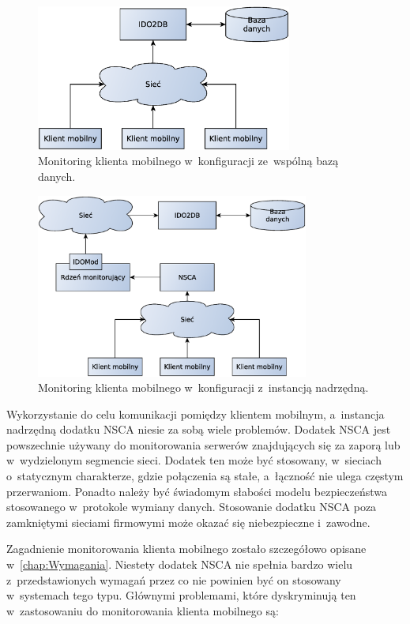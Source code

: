 \begin{figure}[h]
  \centering
  \caption{Monitoring klienta mobilnego w~konfiguracji ze~wspólną bazą
    danych.}
  \label{fig:mobilnyWspBaza}
\includegraphics[width=0.75\textwidth]{img/mobilnyWspBaza}
\end{figure}

\begin{figure}[h]
  \centering
  \caption{Monitoring klienta mobilnego w~konfiguracji z~instancją
    nadrzędną.}
  \label{fig:mobilnyInstancja}
\includegraphics[width=0.80\textwidth]{img/mobilnyInstancja}
\end{figure}

Wykorzystanie do celu komunikacji pomiędzy klientem mobilnym,
a~instancja nadrzędną dodatku NSCA niesie za sobą wiele problemów.
Dodatek NSCA jest powszechnie używany do monitorowania serwerów
znajdujących się za zaporą lub w~wydzielonym segmencie sieci. Dodatek
ten może być stosowany, w~sieciach o~statycznym charakterze, gdzie
połączenia są stałe, a~łączność nie ulega częstym przerwaniom. Ponadto
należy być świadomym słabości modelu bezpieczeństwa stosowanego
w~protokole wymiany danych. Stosowanie dodatku NSCA poza zamkniętymi
sieciami firmowymi może okazać się niebezpieczne i~zawodne.

Zagadnienie monitorowania klienta mobilnego zostało szczegółowo
opisane w~\ref{chap:Wymagania}. Niestety dodatek NSCA nie spełnia
bardzo wielu z~przedstawionych wymagań przez co nie powinien być on
stosowany w~systemach tego typu. Głównymi problemami, które
dyskryminują ten w~zastosowaniu do monitorowania klienta mobilnego są:

